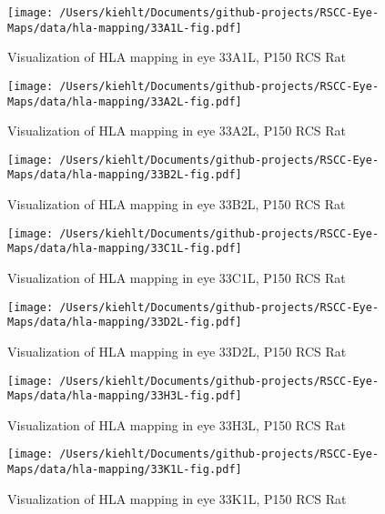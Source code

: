 \documentclass{article}
\begin{document}
\begin{center}
\begin{figure}
\texttt{[image: /Users/kiehlt/Documents/github-projects/RSCC-Eye-Maps/data/hla-mapping/33A1L-fig.pdf]}
\caption{Visualization of HLA mapping in eye 33A1L, P150 RCS Rat}
\label{fig:33A1L}
\end{figure}

\end{center}
\begin{center}
\begin{figure}
\texttt{[image: /Users/kiehlt/Documents/github-projects/RSCC-Eye-Maps/data/hla-mapping/33A2L-fig.pdf]}
\caption{Visualization of HLA mapping in eye 33A2L, P150 RCS Rat}
\label{fig:33A2L}
\end{figure}

\end{center}
\begin{center}
\begin{figure}
\texttt{[image: /Users/kiehlt/Documents/github-projects/RSCC-Eye-Maps/data/hla-mapping/33B2L-fig.pdf]}
\caption{Visualization of HLA mapping in eye 33B2L, P150 RCS Rat}
\label{fig:33B2L}
\end{figure}

\end{center}
\begin{center}
\begin{figure}
\texttt{[image: /Users/kiehlt/Documents/github-projects/RSCC-Eye-Maps/data/hla-mapping/33C1L-fig.pdf]}
\caption{Visualization of HLA mapping in eye 33C1L, P150 RCS Rat}
\label{fig:33C1L}
\end{figure}

\end{center}
\begin{center}
\begin{figure}
\texttt{[image: /Users/kiehlt/Documents/github-projects/RSCC-Eye-Maps/data/hla-mapping/33D2L-fig.pdf]}
\caption{Visualization of HLA mapping in eye 33D2L, P150 RCS Rat}
\label{fig:33D2L}
\end{figure}

\end{center}
\begin{center}
\begin{figure}
\texttt{[image: /Users/kiehlt/Documents/github-projects/RSCC-Eye-Maps/data/hla-mapping/33H3L-fig.pdf]}
\caption{Visualization of HLA mapping in eye 33H3L, P150 RCS Rat}
\label{fig:33H3L}
\end{figure}

\end{center}
\begin{center}
\begin{figure}
\texttt{[image: /Users/kiehlt/Documents/github-projects/RSCC-Eye-Maps/data/hla-mapping/33K1L-fig.pdf]}
\caption{Visualization of HLA mapping in eye 33K1L, P150 RCS Rat}
\label{fig:33K1L}
\end{figure}

\end{center}
\end{document}
